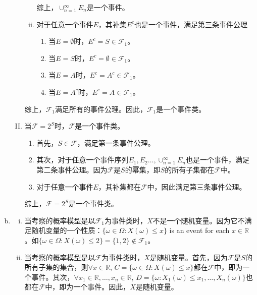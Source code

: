 \documentclass[UTF8]{article}
\begin{document}
\begin{enumerate}[a)]
\begin{enumerate}[I.]
\begin{enumerate}[i.]
                        综上，$\cup^\infty_{n=1}E_n$是一个事件。
                    \item 对于任意一个事件$E$，其补集$E^c$也是一个事件，满足第三条事件公理
                        \begin{enumerate}[(1)]
                            \item 当$E=\emptyset$时，$E^c=S\in\mathcal{F}_1$。
                            \item 当$E=S$时，$E^c=\emptyset\in\mathcal{F}_1$。
                            \item 当$E=A$时，$E^c=A^c\in\mathcal{F}_1$。
                            \item 当$E=A^c$时，$E^c=A\in\mathcal{F}_1$。
                        \end{enumerate}
                \end{enumerate}
                综上，$\mathcal{F}_1$满足所有的事件公理。因此，$\mathcal{F}_1$是一个事件类。
                \item 当$\mathcal{F}=2^S$时，$\mathcal{F}$是一个事件类。
                    \begin{enumerate}
                        \item 首先，$S\in\mathcal{F}$，满足第一条事件公理。
                        \item 其次，对于任意一个事件序列$E_1,E_2\dots,\cup^\infty_{n=1}E_n$也是一个事件，满足第二条事件公理。因为$\mathcal{F}$是$S$的幂集，即$S$的所有子集都在$\mathcal{F}$中。
                        \item 对于任意一个事件$E$，其补集都在$\mathcal{F}$中，因此满足第三条事件公理。
                    \end{enumerate}
                    综上，$\mathcal{F}=2^S$是一个事件类。
            \end{enumerate}  
        \item 
            \begin{enumerate}[i.]
                \item  当考察的概率模型是以$\mathcal{F}_1$为事件类时，$X$不是一个随机变量。因为它不满足随机变量的一个性质：$\{\omega\in\Omega:X(\omega)\leq x\}$ is an event for each $x\in\mathbb{R}$。如$\{\omega\in\Omega:X(\omega)\leq2\}=\{1,2\}\notin\mathcal{F}_1$。
                \item 当考察的概率模型是以$\mathcal{F}$为事件类时，$X$是随机变量。首先，因为$\mathcal{F}$是$S$的所有子集的集合，则$\forall x\in\mathbb{R}$, $C=\{\omega\in\Omega:X(\omega)\leq x\}$都在$\mathcal{F}$中，即为一个事件。其次，$\forall x_1\in\mathbb{R},\dots,x_n\in\mathbb{R}$, $D=\{\omega:X_1(\omega)\leq x_1,\dots,X_n(\omega)\}$也都在$\mathcal{F}$中，即为一个事件。因此，$X$是随机变量。

\end{enumerate}
\end{enumerate}
\end{document}
